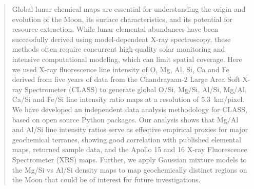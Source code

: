 \documentclass[twocolumn,linenumbers]{aastex631}
\newcommand{\revone}[1]{#1}
\begin{document}
\author[0000-0001-9199-4925]{S. Narendranath}
\author[0000-0001-8525-4867]{Netra S Pillai}

\author[0000-0002-5700-282X]{R. Kashyap}

\author[0000-0002-6112-7609]{V. Bhalerao}

\begin{abstract}
Global lunar chemical maps are essential for understanding the origin and evolution of the Moon, its surface characteristics, and its potential for resource extraction. \revone{While lunar elemental abundances have been successfully derived using model-dependent X-ray spectroscopy, these methods often require concurrent high-quality solar monitoring and intensive computational modeling, which can limit spatial coverage.} Here we used X-ray fluorescence line intensity of O, Mg, Al, Si, Ca and Fe derived from five years of data from the Chandrayaan-2 Large Area Soft X-ray Spectrometer (CLASS) to generate global O/Si, Mg/Si, Al/Si, Mg/Al, Ca/Si and Fe/Si line intensity ratio maps at a resolution of 5.3~km/pixel. We have developed an independent data analysis methodology for CLASS, based on open source Python packages. \revone{Our analysis shows that Mg/Al and Al/Si line intensity ratios serve as effective empirical proxies for major geochemical terranes, showing good correlation with published elemental maps, returned sample data, and the Apollo 15 and 16 X-ray Fluorescence Spectrometer (XRS) maps.}
Further, we apply Gaussian mixture models to the Mg/Si vs Al/Si density maps to map geochemically distinct regions on the Moon that could be of interest for future investigations.
\end{abstract}

\end{document}
